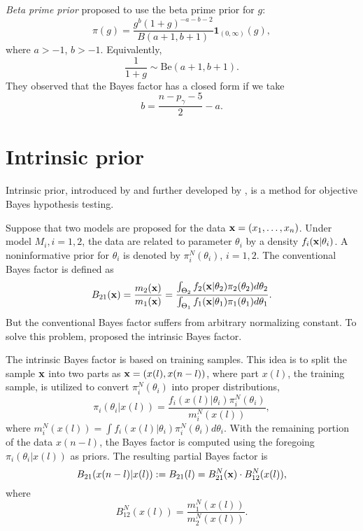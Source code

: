 \documentclass[11pt]{article}
\theoremstyle{plain}
\theoremstyle{definition}
\theoremstyle{remark}
\begin{document}
\emph{Beta prime prior}
\cite{maruyama2011} proposed to use the beta prime prior for $g$:
\begin{equation*}
    \pi(g)=\frac{g^b (1+g)^{-a-b-2}}{B(a+1,b+1)}\mathbf{1}_{(0,\infty)}(g),
\end{equation*}
where $a>-1$, $b>-1$.
Equivalently,
\begin{equation*}
    \frac{1}{1+g}\sim \text{Be} (a+1,b+1).
\end{equation*}
They observed that the Bayes factor has a closed form if we take
\begin{equation*}
    b=\frac{n-p_\gamma-5}{2}-a.
\end{equation*}





\section{Intrinsic prior}
Intrinsic prior, introduced by \cite{intrisicBayesFactor} and further developed by \cite{Moreno1998An}, is a method for objective Bayes hypothesis testing.

Suppose that two models are proposed for the data $\mathbf{x}=(x_1,\ldots, x_n)$.
Under model $M_i, i=1,2$, the data are related to parameter $\theta_i$ by a density $f_i(\mathbf{x} | \theta_i)$.
A noninformative prior for $\theta_i$ is denoted by $\pi_i^N(\theta_i)$, $i=1,2$.
The conventional Bayes factor is defined as
\begin{equation*}
    B_{21}(\mathbf{x}) = \frac{m_2(\mathbf{x})}{m_1(\mathbf{x})}= \frac{\int_{\Theta_2} f_2(\mathbf{x} |\theta_2) \pi_2( \theta_2 ) d \theta_2}{\int_{\Theta_1} f_1(\mathbf{x} | \theta_1) \pi_1 (\theta_1) d \theta_1}.
\end{equation*}
But the conventional Bayes factor suffers from arbitrary normalizing constant.
To solve this problem, \cite{intrisicBayesFactor} proposed the intrinsic Bayes factor.

The intrinsic Bayes factor is based on training samples.
This idea is to split the sample $\mathbf{x}$ into two parts as $\mathbf{x}=(x(l),x(n-l))$, where part $x(l)$, the training sample, is utilized to convert $\pi_i^N(\theta_i)$ into proper distributions,
\begin{equation*}
    \pi_i(\theta_i | x(l)) = \frac{f_i(x(l)|\theta_i) \pi_i^N (\theta_i)}{m_i^N (x(l))},
\end{equation*}
where $m_i^N (x(l))= \int f_i (x(l)| \theta_i) \pi_i^N (\theta_i) d\theta_i$.
With the remaining portion of the data $x(n-l)$, the Bayes factor is computed using the foregoing $\pi_i(\theta_i | x(l))$ as priors.
The resulting partial Bayes factor is
\begin{equation*}
    B_{21} (x(n-l)|x(l)) := B_{21} (l) = B_{21}^N (\mathbf{x})\cdot B_{12}^N (x(l)),
\end{equation*}
where
\begin{equation*}
    B_{12}^N (x(l))= \frac{m_1^N (x(l))}{m_2^N (x(l))}.
\end{equation*}
\end{document}
